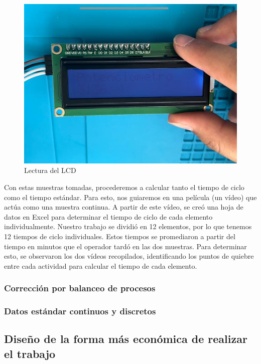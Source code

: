     
    \begin{figure}[H]
        \centering
        \includegraphics[scale=0.28]{35/Img/evidenciaM23.jpeg}
        \caption{Lectura del LCD}
    \end{figure}
    
    
    
    Con estas muestras tomadas, procederemos a calcular tanto el tiempo de ciclo como el tiempo estándar. Para esto, nos guiaremos en una película (un vídeo) que actúa como una muestra continua. A partir de este vídeo, se creó una hoja de datos en Excel para determinar el tiempo de ciclo de cada elemento individualmente. Nuestro trabajo se dividió en 12 elementos, por lo que tenemos 12 tiempos de ciclo individuales. Estos tiempos se promediaron a partir del tiempo en minutos que el operador tardó en las dos muestras. Para determinar esto, se observaron los dos vídeos recopilados, identificando los puntos de quiebre entre cada actividad para calcular el tiempo de cada elemento.
    
    
    \subsubsection{Corrección por balanceo de procesos}
    \subsubsection{Datos estándar continuos y discretos}
    \subsection{Diseño de la forma más económica de realizar el trabajo}
    
